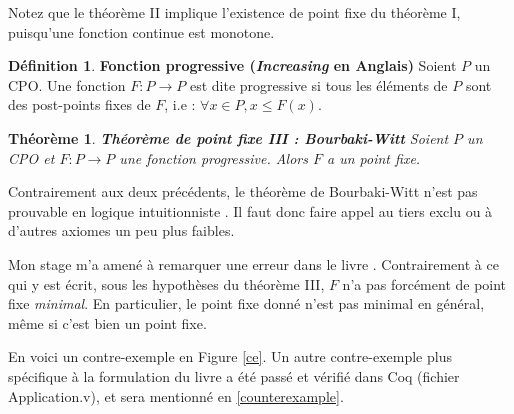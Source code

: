 \documentclass{article}
\newtheorem{theorem}{Théorème}[section]
\theoremstyle{definition}
\newtheorem{definition}{Définition}[section]
\begin{document}
Notez que le théorème II implique l'existence de point fixe du théorème I, puisqu'une fonction continue est monotone.

\begin{definition}{\textbf{Fonction progressive (\textit{Increasing} en Anglais)}}
Soient $P$ un CPO. Une fonction $F : P \rightarrow P$ est dite progressive si tous les éléments de $P$ sont des post-points fixes de $F$, i.e : $\forall x \in P, x \leq F(x)$.

\end{definition}

\begin{theorem}{\textbf{Théorème de point fixe III : Bourbaki-Witt}}
Soient $P$ un CPO et $F : P \rightarrow P$ une fonction progressive. Alors $F$ a un point fixe.
\end{theorem}

Contrairement aux deux précédents, le théorème de Bourbaki-Witt n'est pas prouvable en logique intuitionniste \cite{bw}. Il faut donc faire appel au tiers exclu ou à d'autres axiomes un peu plus faibles.

Mon stage m'a amené à remarquer une erreur dans le livre \cite[page 188]{main}.
Contrairement à ce qui y est écrit, sous les hypothèses du théorème III, $F$ n'a pas forcément de point fixe \emph{minimal}. En particulier, le point fixe donné n'est pas minimal en général, même si c'est bien un point fixe.%

En voici un contre-exemple en Figure \ref{ce}. Un autre contre-exemple plus spécifique à la formulation du livre a été passé et vérifié dans Coq (fichier Application.v), et sera mentionné en \ref{counterexample}.
\end{document}
